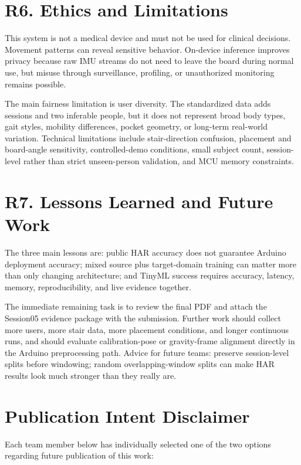 \documentclass[11pt,a4paper]{article}
\begin{document}
\section{R6. Ethics and Limitations}

This system is not a medical device and must not be used for clinical decisions. Movement patterns can reveal sensitive behavior. On-device inference improves privacy because raw IMU streams do not need to leave the board during normal use, but misuse through surveillance, profiling, or unauthorized monitoring remains possible.

The main fairness limitation is user diversity. The standardized data adds sessions and two inferable people, but it does not represent broad body types, gait styles, mobility differences, pocket geometry, or long-term real-world variation. Technical limitations include stair-direction confusion, placement and board-angle sensitivity, controlled-demo conditions, small subject count, session-level rather than strict unseen-person validation, and MCU memory constraints.

\section{R7. Lessons Learned and Future Work}

The three main lessons are: public HAR accuracy does not guarantee Arduino deployment accuracy; mixed source plus target-domain training can matter more than only changing architecture; and TinyML success requires accuracy, latency, memory, reproducibility, and live evidence together.

The immediate remaining task is to review the final PDF and attach the Session05 evidence package with the submission. Further work should collect more users, more stair data, more placement conditions, and longer continuous runs, and should evaluate calibration-pose or gravity-frame alignment directly in the Arduino preprocessing path. Advice for future teams: preserve session-level splits before windowing; random overlapping-window splits can make HAR results look much stronger than they really are.

\section*{Publication Intent Disclaimer}

Each team member below has individually selected one of the two options regarding future publication of this work:
\end{document}
